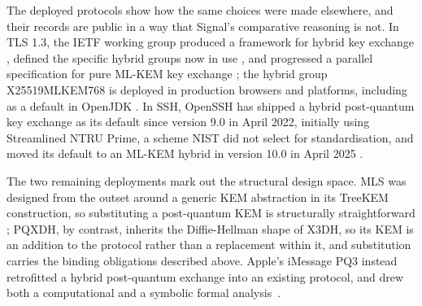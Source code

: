 The deployed protocols show how the same choices were made elsewhere, and their records are public in a way that Signal's comparative reasoning is not. In TLS 1.3, the IETF working group produced a framework for hybrid key exchange \cite{stebila_hybrid_2025}, defined the specific hybrid groups now in use \cite{kwiatkowski_post-quantum_2026}, and progressed a parallel specification for pure ML-KEM key exchange \cite{connolly_ml-kem_2026}; the hybrid group X25519MLKEM768 is deployed in production browsers and platforms, including as a default in OpenJDK \cite{noauthor_jep_nodate}. In SSH, OpenSSH has shipped a hybrid post-quantum key exchange as its default since version 9.0 in April 2022, initially using Streamlined NTRU Prime, a scheme NIST did not select for standardisation, and moved its default to an ML-KEM hybrid in version 10.0 in April 2025 \cite{noauthor_openssh_nodate}.

The two remaining deployments mark out the structural design space. MLS was designed from the outset around a generic KEM abstraction in its TreeKEM construction, so substituting a post-quantum KEM is structurally straightforward \cite{barnes_messaging_2023}; PQXDH, by contrast, inherits the Diffie-Hellman shape of X3DH, so its KEM is an addition to the protocol rather than a replacement within it, and substitution carries the binding obligations described above. Apple's iMessage PQ3 instead retrofitted a hybrid post-quantum exchange into an existing protocol, and drew both a computational and a symbolic formal analysis~\cite{noauthor_imessage_nodate, stebila_security_nodate, linker_formal_2025}.


